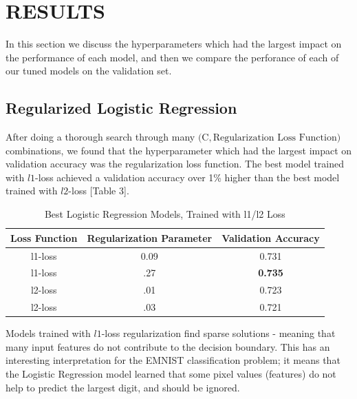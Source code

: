 \documentclass[letterpaper, 10 pt, conference]{ieeeconf}
\begin{document}
\section{RESULTS}

In this section we discuss the hyperparameters which had the largest impact on the performance of each model, and then we compare the perforance of each of our tuned models on the validation set. 

\subsection{Regularized Logistic Regression} 

After doing a thorough search through many $\big(\text{C}, \text{Regularization Loss Function}\big)$ combinations, we found that the hyperparameter which had the largest impact on validation accuracy was the regularization loss function. The best model trained with $l1$-loss achieved a validation accuracy over 1\% higher than the best model trained with $l2$-loss [Table 3].

\begin{table}[H]
\centering
\caption{Best Logistic Regression Models, Trained with l1/l2 Loss}
\label{my-}
\begin{tabular}{|c|c|c|}
\hline
\textbf{Loss Function} & \textbf{Regularization Parameter} & \textbf{Validation Accuracy} \\ \hline
l1-loss                & 0.09                              & 0.731                        \\ \hline
l1-loss                & .27                               & \textbf{0.735}               \\ \hline
l2-loss                & .01                               & 0.723                        \\ \hline
l2-loss                & .03                               & 0.721                        \\ \hline
\end{tabular}
\end{table}

Models trained with $l1$-loss regularization find sparse solutions - meaning that many input features do not contribute to the decision boundary. This has an interesting interpretation for the EMNIST classification problem; it means that the Logistic Regression model learned that some pixel values (features) do not help to predict the largest digit, and should be ignored.
\end{document}
